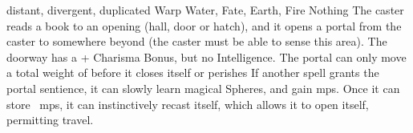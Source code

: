   {distant, divergent, duplicated}%
  {Warp}%
  {Water, Fate, Earth, Fire}%
  {Nothing}%
  {The caster reads a book to an opening (hall, door or hatch), and it opens a portal from the caster to somewhere beyond \spellRange
  (the caster must be able to sense this area).
  The doorway has a + Charisma Bonus, but no Intelligence.
  The portal can only move a total \gls{weight} of  before it closes itself or perishes}%
  {
  If another spell grants the portal sentience, it can slowly learn magical Spheres, and gain \glspl{mp}.
  Once it can store ~\glspl{mp}, it can instinctively recast itself, which allows it to open itself, permitting travel.}
